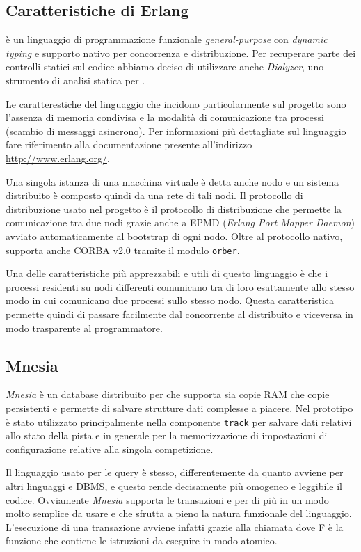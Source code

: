 \subsection*{Caratteristiche di Erlang}
\Erlang{} è un linguaggio di programmazione funzionale \textit{general-purpose} con \textit{dynamic typing} e supporto nativo per concorrenza e distribuzione. Per recuperare parte dei controlli statici sul codice abbiamo deciso di utilizzare anche \textsl{Dialyzer}, uno strumento di analisi statica per \Erlang{}.

Le caratterestiche del linguaggio che incidono particolarmente sul progetto sono l'assenza di memoria condivisa e la modalità di comunicazione tra processi (scambio di messaggi asincrono).
Per informazioni più dettagliate sul linguaggio fare riferimento alla documentazione presente all'indirizzo \url{http://www.erlang.org/}.


Una singola istanza di una macchina virtuale \Erlang{} è detta anche nodo \Erlang{} e un sistema \Erlang{} distribuito è composto quindi da una rete di tali nodi. Il protocollo di distribuzione usato nel progetto è il protocollo di distribuzione \Erlang{} che permette la comunicazione tra due nodi \Erlang{} grazie anche a EPMD (\textsl{Erlang Port Mapper Daemon}) avviato automaticamente al bootstrap di ogni nodo. Oltre al protocollo nativo, \Erlang{} supporta anche CORBA v2.0 tramite il modulo \texttt{orber}.

Una delle caratteristiche più apprezzabili e utili di questo linguaggio è che i processi residenti su nodi differenti comunicano tra di loro esattamente allo stesso modo in cui comunicano due processi sullo stesso nodo. Questa caratteristica permette quindi di passare facilmente dal concorrente al distribuito e viceversa in modo trasparente al programmatore.

\subsection*{Mnesia}
\textsl{Mnesia} è un database distribuito per \Erlang{} che supporta sia copie RAM che copie persistenti e permette di salvare strutture dati complesse a piacere. Nel prototipo è stato utilizzato principalmente nella componente \texttt{track} per salvare dati relativi allo stato della pista e in generale per la memorizzazione di impostazioni di configurazione relative alla singola competizione.

Il linguaggio usato per le query è \Erlang{} stesso, differentemente da quanto avviene per altri linguaggi e DBMS, e questo rende decisamente più omogeneo e leggibile il codice. Ovviamente \textsl{Mnesia} supporta le transazioni e per di più in un modo molto semplice da usare e che sfrutta a pieno la natura funzionale del linguaggio. L'esecuzione di una transazione avviene infatti grazie alla chiamata  dove F è la funzione che contiene le istruzioni da eseguire in modo atomico.

